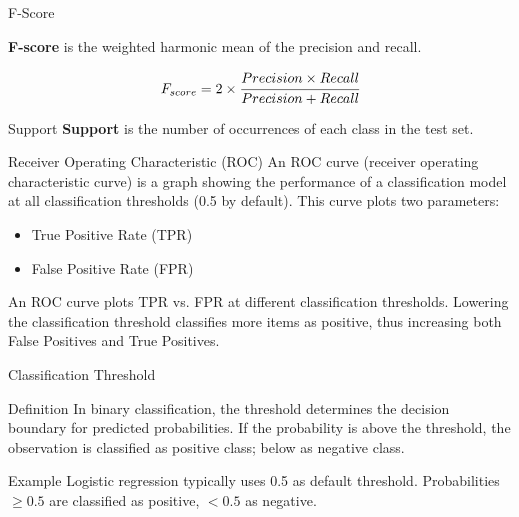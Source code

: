 \documentclass[aspectratio=169,xcolor=dvipsnames,svgnames,x11names,fleqn]{beamer}
\begin{document}
\begin{frame}{F-Score}



    \textbf{F-score} is the weighted harmonic mean of the precision and recall.

$$
F_{score} = 2\times \cfrac{Precision \times Recall}{Precision + Recall}
$$
    
\end{frame}

\begin{frame}{Support}
    \textbf{Support} is the number of occurrences of each class in the test set.
\end{frame}


\begin{frame}[containsverbatim]{Receiver Operating Characteristic (ROC)}
    An ROC curve (receiver operating characteristic curve) is a graph showing the performance of a classification model at all classification thresholds (0.5 by default). This curve plots two parameters:
    
    \begin{itemize}
        \item True Positive Rate (TPR)
        \item False Positive Rate (FPR)
    \end{itemize}
    
    An ROC curve plots TPR vs. FPR at different classification thresholds. Lowering the classification threshold classifies more items as positive, thus increasing both False Positives and True Positives.

\end{frame}
    
\begin{frame}{Classification Threshold}

    \begin{tblock}{Definition}
        In binary classification, the threshold determines the decision boundary for predicted probabilities. If the probability is above the threshold, the observation is classified as positive class; below as negative class.
    \end{tblock}
    \begin{tblock}{Example}
        Logistic regression typically uses 0.5 as default threshold. Probabilities $\geq 0.5$ are classified as positive, $<0.5$ as negative.
    \end{tblock}

\end{frame}
\end{document}
